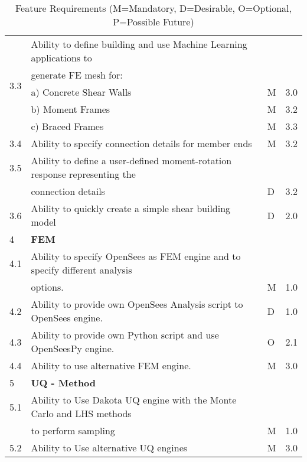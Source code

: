 \begin{table}[hbt!]
\begin{adjustbox}{max width=\textwidth}
\begin{tabular}{llll}
	\multirow{5}{*}{3.3} & Ability to define building and use Machine Learning applications to &&\\
	 & generate FE mesh for: &  &  \\ 
	 & a)     Concrete Shear Walls & M & 3.0 \\ 
	 & b)     Moment Frames & M & 3.2 \\ 
	 & c)     Braced Frames & M & 3.3  \\ \hline

	3.4 & Ability to specify connection details for member ends & M & 3.2 \\ \hline
	3.5 & Ability to define a user-defined moment-rotation response representing the &&\\
	    & connection details & D & 3.2 \\ \hline
	3.6 & Ability to quickly create a simple shear building model & D & 2.0 \\ \hline
	4 & \textbf{FEM} &  &  \\ \hline
	4.1 & Ability to specify OpenSees as FEM engine and to specify different analysis&&\\
	    & options. & M & 1.0 \\ \hline
	4.2 & Ability to provide own OpenSees Analysis script to OpenSees engine. & D & 1.0 \\ \hline
	4.3 & Ability to provide own Python script and use OpenSeesPy engine. & O & 2.1 \\ \hline
	4.4 & Ability to use alternative FEM engine. & M & 3.0 \\ \hline
	5 & \textbf{UQ - Method} &  &  \\ \hline
	5.1 & Ability to Use Dakota UQ engine with the Monte Carlo and LHS methods &&\\
	    & to perform sampling & M & 1.0 \\ \hline
	5.2 & Ability to Use alternative UQ engines & M & 3.0 \\ \hline
      \bottomrule                                  
  \end{tabular}
\end{adjustbox}
  \caption{Feature Requirements (M=Mandatory, D=Desirable, O=Optional, P=Possible Future)}             
  \label{tab:featureRequirements_1}                 
\end{table}

